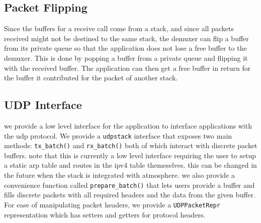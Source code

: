 \subsection{Packet Flipping}
Since the buffers for a receive call come from a stack, and since all packets received might not be destined to the same stack, the demuxer can flip a buffer from its private queue so that the application does not lose a free buffer to the demuxer. This is done by popping a buffer from a private queue and flipping it with the received buffer. The application can then get a free buffer in return for the buffer it contributed for the packet of another stack.


\subsection{UDP Interface}
we provide a low level interface for the application to interface applications with the udp protocol. We provide a \lstinline{udpstack} interface that exposes two main methods: \lstinline{tx_batch()} and \lstinline{rx_batch()} both of which interact with discrete packet buffers. note that this is currently a low level interface requiring the user to setup a static arp table and routes in the ipv4 table themeselves. this can be changed in the future when the stack is integrated with atmosphere. we also provide a convenience function called \lstinline{prepare_batch()} that lets users provide a buffer and fills discrete packets with all required headers and the data from the given buffer. For ease of manipulating packet headers, we provide a \lstinline{UDPPacketRepr} representation which has setters and getters for protocol headers.  


